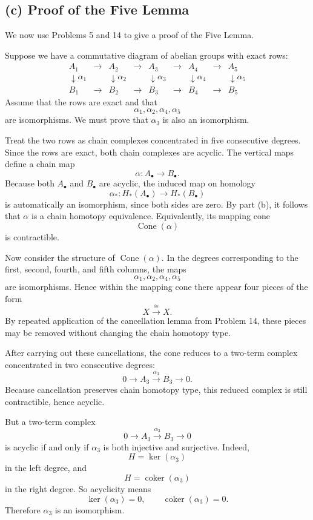 \documentclass[12pt,a4paper]{article}
\theoremstyle{notespace}
\begin{document}
\subsection*{(c) Proof of the Five Lemma}

We now use Problems 5 and 14 to give a proof of the Five Lemma.

Suppose we have a commutative diagram of abelian groups with exact rows:
\[
\begin{array}{ccccccccc}
	A_1 &\longrightarrow& A_2 &\longrightarrow& A_3 &\longrightarrow& A_4 &\longrightarrow& A_5\\
	\downarrow \alpha_1 && \downarrow \alpha_2 && \downarrow \alpha_3 && \downarrow \alpha_4 && \downarrow \alpha_5\\
	B_1 &\longrightarrow& B_2 &\longrightarrow& B_3 &\longrightarrow& B_4 &\longrightarrow& B_5
\end{array}
\]
Assume that the rows are exact and that
\[
\alpha_1,\alpha_2,\alpha_4,\alpha_5
\]
are isomorphisms. We must prove that \(\alpha_3\) is also an isomorphism.

Treat the two rows as chain complexes concentrated in five consecutive degrees. Since the rows are exact, both chain complexes are acyclic. The vertical maps define a chain map
\[
\alpha:A_\bullet\to B_\bullet.
\]
Because both \(A_\bullet\) and \(B_\bullet\) are acyclic, the induced map on homology
\[
\alpha_*:H_*(A_\bullet)\to H_*(B_\bullet)
\]
is automatically an isomorphism, since both sides are zero. By part (b), it follows that \(\alpha\) is a chain homotopy equivalence. Equivalently, its mapping cone
\[
\operatorname{Cone}(\alpha)
\]
is contractible.

Now consider the structure of \(\operatorname{Cone}(\alpha)\). In the degrees corresponding to the first, second, fourth, and fifth columns, the maps
\[
\alpha_1,\alpha_2,\alpha_4,\alpha_5
\]
are isomorphisms. Hence within the mapping cone there appear four pieces of the form
\[
X\xrightarrow{\cong} X.
\]
By repeated application of the cancellation lemma from Problem 14, these pieces may be removed without changing the chain homotopy type.

After carrying out these cancellations, the cone reduces to a two-term complex concentrated in two consecutive degrees:
\[
0\longrightarrow A_3 \xrightarrow{\alpha_3} B_3 \longrightarrow 0.
\]
Because cancellation preserves chain homotopy type, this reduced complex is still contractible, hence acyclic.

But a two-term complex
\[
0\to A_3\xrightarrow{\alpha_3}B_3\to 0
\]
is acyclic if and only if \(\alpha_3\) is both injective and surjective. Indeed,
\[
H=\ker(\alpha_3)
\]
in the left degree, and
\[
H=\operatorname{coker}(\alpha_3)
\]
in the right degree. So acyclicity means
\[
\ker(\alpha_3)=0,\qquad \operatorname{coker}(\alpha_3)=0.
\]
Therefore \(\alpha_3\) is an isomorphism.
\end{document}
